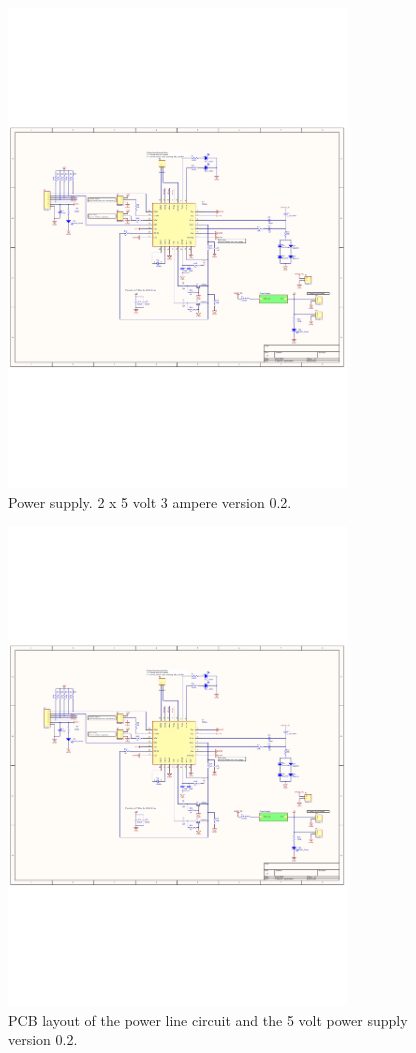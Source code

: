 \begin{figure}[H]
	\begin{centering}
		 \includegraphics[width=0.8\textwidth,page=2,angle=0]{content/appendix/eudp/images/SIG60_v0_2}
		\caption{Power supply. 2 x 5 volt 3 ampere version 0.2.}
	\end{centering}
\end{figure}

\begin{figure}[H]
	\begin{centering}
		 \includegraphics[width=0.8\textwidth,page=3,angle=0]{content/appendix/eudp/images/SIG60_v0_2}
		\caption{PCB layout of the power line circuit and the 5 volt power supply version 0.2.}
	\end{centering}
\end{figure}

